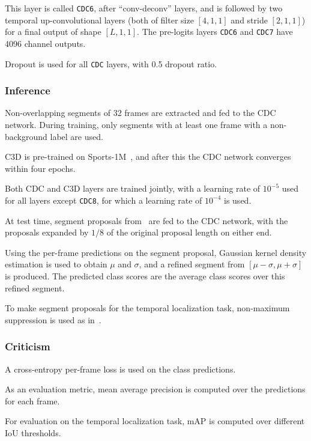 \documentclass[a4paper, 12pt]{article}
\begin{document}
This layer is called \verb|CDC6|, after ``conv-deconv'' layers, and is followed
by two temporal up-convolutional layers (both of filter size $[4, 1, 1]$ and
stride $[2, 1, 1]$) for a final output of shape $[L, 1, 1]$.  The pre-logits
layers \verb|CDC6| and \verb|CDC7| have 4096 channel outputs.

Dropout is used for all \verb|CDC| layers, with 0.5 dropout ratio.

\subsubsection{Inference}

Non-overlapping segments of 32 frames are extracted and fed to the CDC network.
During training, only segments with at least one frame with a non-background
label are used.

C3D is pre-trained on Sports-1M~\cite{KarpathyCVPR14}, and after this the CDC
network converges within four epochs.

Both CDC and C3D layers are trained jointly, with a learning rate of
$10^{-5}$ used for all layers except \verb|CDC8|, for which a learning rate
of $10^{-4}$ is used.

At test time, segment proposals from~\cite{DBLP:journals/corr/ShouWC16} are
fed to the CDC network, with the proposals expanded by $1/8$ of the original
proposal length on either end.

Using the per-frame predictions on the segment proposal, Gaussian kernel
density estimation is used to obtain $\mu$ and $\sigma$, and a refined segment
from $[\mu - \sigma, \mu + \sigma]$ is produced. The predicted class scores are
the average class scores over this refined segment.

To make segment proposals for the temporal localization task, non-maximum
suppression is used as
in~\cite{DBLP:journals/corr/YeungRJAML15, DBLP:journals/corr/ShouWC16}.

\subsubsection{Criticism}

A cross-entropy per-frame loss is used on the class predictions.

As an evaluation metric, mean average precision is computed over the
predictions for each frame.

For evaluation on the temporal localization task, mAP is computed over
different IoU thresholds.
\end{document}
